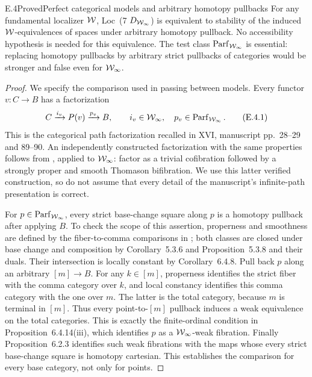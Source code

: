 \begin{claim}{E.4}{Proved}{Perfect categorical models and arbitrary homotopy pullbacks}
For any fundamental localizer $\mathcal{W}$, Loc~(7 $D_{\mathcal{W}_{\infty}}$) is
equivalent to stability of the induced $\mathcal{W}$-equivalences of
spaces under arbitrary homotopy pullback. No accessibility
hypothesis is needed for this equivalence. The test class
$\operatorname{Parf}_{\mathcal{W}_{\infty}}$ is essential: replacing homotopy pullbacks
by arbitrary strict pullbacks of categories would be stronger
and false even for $\mathcal{W}_{\infty}$.
\end{claim}
\begin{proof}
We specify the comparison used in passing between models.
Every functor $v:C\to B$ has a factorization
\[
 C\xrightarrow{i_v}P(v)\xrightarrow{p_v}B,
 \qquad i_v\in\mathcal{W}_{\infty},\quad p_v\in\operatorname{Parf}_{\mathcal{W}_{\infty}}.
                                                               \tag{E.4.1}
\]
This is the categorical path factorization recalled in XVI,
manuscript pp.~28--29 and 89--90. An independently constructed
factorization with the same properties follows from
\citet[Theorem 5.3.14]{RootCisinski2006}, applied to $\mathcal{W}_{\infty}$:
factor as a trivial cofibration followed by a strongly proper
and smooth Thomason bifibration. We use this latter verified
construction, so do not assume that every detail of the
manuscript's infinite-path presentation is correct.

For $p\in\operatorname{Parf}_{\mathcal{W}_{\infty}}$, every strict base-change square
along $p$ is a homotopy pullback after applying $B$.
To check the scope of this assertion, properness and smoothness
are defined by the fiber-to-comma comparisons in
\citet[Definition 5.3.1]{RootCisinski2006}; both classes are
closed under base change and composition by Corollary~5.3.6
and Proposition~5.3.8 and their duals. Their intersection is
locally constant by Corollary~6.4.8. Pull back $p$ along an
arbitrary $[m]\to B$. For any $k\in[m]$, properness identifies
the strict fiber with the comma category over $k$, and local
constancy identifies this comma category with the one over
$m$. The latter is the total category, because $m$ is terminal
in $[m]$. Thus every point-to-$[m]$ pullback induces a weak
equivalence on the total categories. This is exactly the
finite-ordinal condition in Proposition~6.4.14(iii), which
identifies $p$ as a $\mathcal{W}_{\infty}$-weak fibration. Finally
Proposition~6.2.3 identifies such weak fibrations with the maps
whose every strict base-change square is homotopy cartesian.
This establishes the comparison for every base category,
not only for points.


\end{proof}
